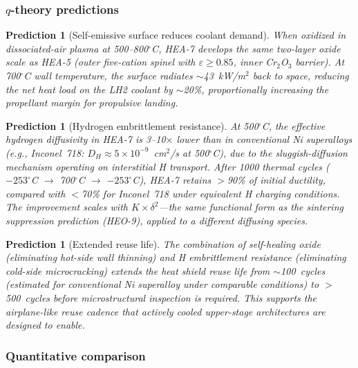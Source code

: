 \documentclass[12pt,letterpaper]{article}
\newtheorem{prediction}[theorem]{Prediction}
\theoremstyle{definition}
\begin{document}
\subsubsection{$q$-theory predictions}

\begin{prediction}[Self-emissive surface reduces coolant demand]\label{pred:active_emissivity}
When oxidized in dissociated-air plasma at 500--800$^\circ$C, HEA-7 develops the same two-layer oxide scale as HEA-5 (outer five-cation spinel with $\varepsilon \geq 0.85$, inner Cr$_2$O$_3$ barrier).  At 700$^\circ$C wall temperature, the surface radiates $\sim$43~kW/m$^2$ back to space, reducing the net heat load on the LH2 coolant by $\sim$20\%, proportionally increasing the propellant margin for propulsive landing.
\end{prediction}

\begin{prediction}[Hydrogen embrittlement resistance]\label{pred:H_embrittlement}
At 500$^\circ$C, the effective hydrogen diffusivity in HEA-7 is 3--10$\times$ lower than in conventional Ni superalloys (e.g., Inconel~718: $D_H \approx 5 \times 10^{-9}$~cm$^2$/s at 500$^\circ$C), due to the sluggish-diffusion mechanism operating on interstitial H transport.  After 1000 thermal cycles ($-253^\circ$C $\to$ 700$^\circ$C $\to$ $-253^\circ$C), HEA-7 retains $>$90\% of initial ductility, compared with $<$70\% for Inconel~718 under equivalent H charging conditions.  The improvement scales with $K \times \delta^2$---the same functional form as the sintering suppression prediction (HEO-9), applied to a different diffusing species.
\end{prediction}

\begin{prediction}[Extended reuse life]\label{pred:active_life}
The combination of self-healing oxide (eliminating hot-side wall thinning) and H embrittlement resistance (eliminating cold-side microcracking) extends the heat shield reuse life from $\sim$100~cycles (estimated for conventional Ni superalloy under comparable conditions) to $>$500~cycles before microstructural inspection is required.  This supports the airplane-like reuse cadence that actively cooled upper-stage architectures are designed to enable.
\end{prediction}

\subsubsection{Quantitative comparison}
\end{document}
